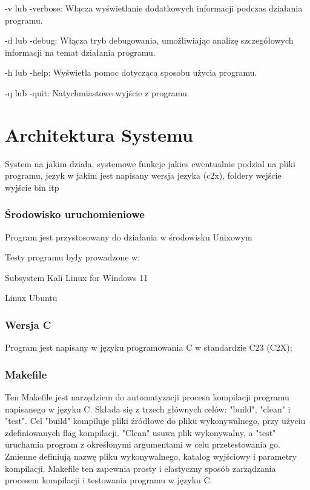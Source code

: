 \documentclass[
]{article}
\begin{document}
-v lub -verbose: Włącza wyświetlanie dodatkowych informacji podczas
działania programu.

-d lub -debug: Włącza tryb debugowania, umożliwiając analizę
szczegółowych informacji na temat działania programu.

-h lub -help: Wyświetla pomoc dotyczącą sposobu użycia programu.

-q lub -quit: Natychmiastowe wyjście z programu.

\hypertarget{architektura-systemu}{%
\section{Architektura Systemu}\label{architektura-systemu}}

System na jakim działa, systemowe funkcje jakies ewentualnie podzial na
pliki programu, jezyk w jakim jest napisany wersja jezyka (c2x), foldery
wejście wyjście bin itp

\hypertarget{ux15brodowisko-uruchomieniowe}{%
\subsubsection{Środowisko
uruchomieniowe}\label{ux15brodowisko-uruchomieniowe}}

Program jest przystosowany do działania w środowisku Unixowym

Testy programu były prowadzone w:

Subsystem Kali Linux for Windows 11

Linux Ubuntu

\hypertarget{wersja-c}{%
\subsubsection{\texorpdfstring{Wersja C }{Wersja C }}\label{wersja-c}}

Program jest napisany w języku programowania C w standardzie C23 (C2X);

\hypertarget{makefile}{%
\subsubsection{Makefile}\label{makefile}}

Ten Makefile jest narzędziem do automatyzacji procesu kompilacji
programu napisanego w języku C. Składa się z trzech głównych celów:
"build", "clean" i "test". Cel "build" kompiluje pliki źródłowe do pliku
wykonywalnego, przy użyciu zdefiniowanych flag kompilacji. "Clean" usuwa
plik wykonywalny, a "test" uruchamia program z określonymi argumentami w
celu przetestowania go. Zmienne definiują nazwę pliku wykonywalnego,
katalog wyjściowy i parametry kompilacji. Makefile ten zapewnia prosty i
elastyczny sposób zarządzania procesem kompilacji i testowania programu
w języku C.
\end{document}
